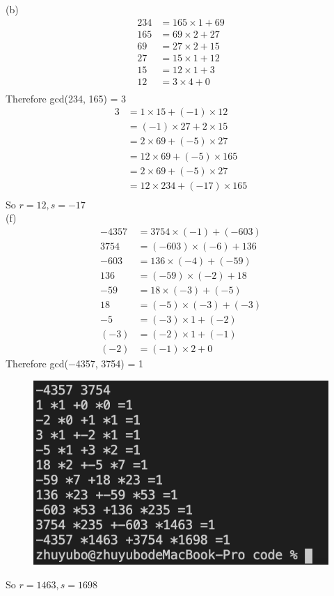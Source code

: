 \documentclass[a4paper, justified]{tufte-handout}
\begin{document}
\begin{solution}
(b)\\
\[
\begin{aligned}
234&=165\times 1 + 69\\
165&=69\times 2 + 27\\
69 & = 27\times 2 + 15\\
27 & = 15\times 1 + 12\\
15& = 12\times 1 + 3\\
12 & = 3 \times 4 + 0\\
\end{aligned}
\]
Therefore gcd(234, 165) = 3\\
\[
\begin{aligned}
3 &= 1\times15 + (-1)\times 12\\
&=(-1)\times27 + 2\times 15\\
&=2\times 69 + (-5)\times 27\\
&=12\times 69 + (-5)\times 165\\
&=2\times 69 + (-5)\times 27\\
&=12\times 234 + (-17)\times 165\\
\end{aligned}
\]
So $r=12,s=-17$\\
\newpage
\noindent(f)\\
\[
\begin{aligned}
-4357&=3754\times(-1) + (-603)\\
3754&= (-603)\times (-6) + 136\\
-603 &=136\times (-4) + (-59)\\
136 &=(-59)\times(-2) + 18\\
-59 & = 18\times (-3) + (-5)\\
18 & = (-5)\times(-3) + (-3)\\
-5 &=(-3)\times1 + (-2)\\
(-3) & = (-2)\times 1 + (-1)\\
(-2) & = (-1)\times2 + 0 
\end{aligned}
\]
Therefore gcd(−4357, 3754) = 1\\
 \begin{figure}[htbp]
    \centering
    \includegraphics[width = 0.60\linewidth]{figs/a}
  \end{figure}

So $r=1463,s=1698$\\

\end{solution}
\end{document}
